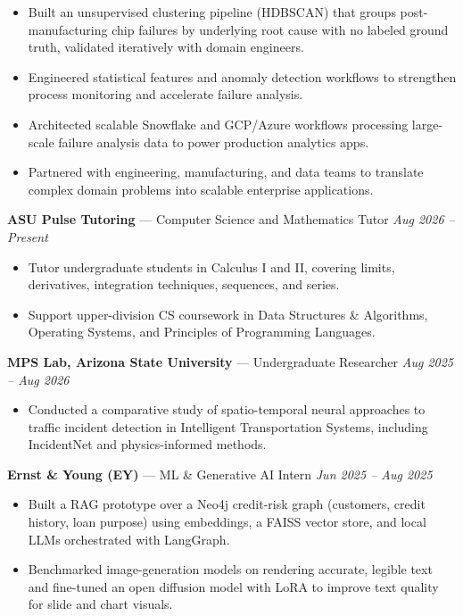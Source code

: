 \documentclass[a4paper,8pt]{extarticle}
\begin{document}
\begin{itemize}
\item Built an unsupervised clustering pipeline (HDBSCAN) that groups post-manufacturing chip failures by underlying root cause with no labeled ground truth, validated iteratively with domain engineers.
\item Engineered statistical features and anomaly detection workflows to strengthen process monitoring and accelerate failure analysis.
\item Architected scalable Snowflake and GCP/Azure workflows processing large-scale failure analysis data to power production analytics apps.
\item Partnered with engineering, manufacturing, and data teams to translate complex domain problems into scalable enterprise applications.
\end{itemize}

\noindent
\textbf{ASU Pulse Tutoring} --- Computer Science and Mathematics Tutor
\hfill \textit{Aug 2026 -- Present}

\begin{itemize}
\item Tutor undergraduate students in Calculus I and II, covering limits, derivatives, integration techniques, sequences, and series.
\item Support upper-division CS coursework in Data Structures \& Algorithms, Operating Systems, and Principles of Programming Languages.
\end{itemize}

\noindent
\textbf{MPS Lab, Arizona State University} --- Undergraduate Researcher
\hfill \textit{Aug 2025 -- Aug 2026}

\begin{itemize}
\item Conducted a comparative study of spatio-temporal neural approaches to traffic incident detection in Intelligent Transportation Systems, including IncidentNet and physics-informed methods.
\end{itemize}

\noindent
\textbf{Ernst \& Young (EY)} --- ML \& Generative AI Intern
\hfill \textit{Jun 2025 -- Aug 2025}

\begin{itemize}
\item Built a RAG prototype over a Neo4j credit-risk graph (customers, credit history, loan purpose) using embeddings, a FAISS vector store, and local LLMs orchestrated with LangGraph.
\item Benchmarked image-generation models on rendering accurate, legible text and fine-tuned an open diffusion model with LoRA to improve text quality for slide and chart visuals.
\end{itemize}
\end{document}
